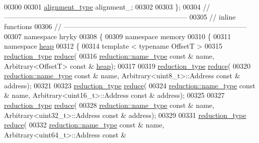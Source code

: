\begin{DoxyCode}
00300 
00301     \hyperlink{namespacehryky_aee1af251193c2d308aaa68ef7e36a540}{alignment_type}      alignment\_;
00302     
00303 \};
00304 \textcolor{comment}{//
      ------------------------------------------------------------------------------}
00305 \textcolor{comment}{// inline functions}
00306 \textcolor{comment}{//
      ------------------------------------------------------------------------------}
00307 \textcolor{keyword}{namespace }hryky
00308 \{
00309 \textcolor{keyword}{namespace }memory
00310 \{
00311 \textcolor{keyword}{namespace }\hyperlink{namespacehryky_1_1memory_1_1global_a6fc6103f67c837aa0f39b359588409cd}{heap}
00312 \{
00314     \textcolor{keyword}{template} < \textcolor{keyword}{typename} OffsetT >
00315     \hyperlink{namespacehryky_a343a9a4c36a586be5c2693156200eadc}{reduction_type} \hyperlink{namespacehryky_1_1memory_1_1heap_aa4df42a3456c681bd0b3c0e44fced36b}{reduce}(
00316         \hyperlink{namespacehryky_1_1reduction_ac686c30a4c8d196bbd0f05629a6b921f}{reduction::name_type} \textcolor{keyword}{const} & name, Arbitrary<OffsetT> \textcolor{keyword}{const} & \hyperlink{namespacehryky_1_1memory_1_1global_a6fc6103f67c837aa0f39b359588409cd}{heap});
00317 
00319     \hyperlink{namespacehryky_a343a9a4c36a586be5c2693156200eadc}{reduction_type} \hyperlink{namespacehryky_1_1memory_1_1heap_aa4df42a3456c681bd0b3c0e44fced36b}{reduce}(
00320         \hyperlink{namespacehryky_1_1reduction_ac686c30a4c8d196bbd0f05629a6b921f}{reduction::name_type} \textcolor{keyword}{const} & name, Arbitrary<uint8\_t>::Address \textcolor{keyword}{const} & 
      address);
00321 
00323     \hyperlink{namespacehryky_a343a9a4c36a586be5c2693156200eadc}{reduction_type} \hyperlink{namespacehryky_1_1memory_1_1heap_aa4df42a3456c681bd0b3c0e44fced36b}{reduce}(
00324         \hyperlink{namespacehryky_1_1reduction_ac686c30a4c8d196bbd0f05629a6b921f}{reduction::name_type} \textcolor{keyword}{const} & name, Arbitrary<uint16\_t>::Address \textcolor{keyword}{const} &
       address);
00325 
00327     \hyperlink{namespacehryky_a343a9a4c36a586be5c2693156200eadc}{reduction_type} \hyperlink{namespacehryky_1_1memory_1_1heap_aa4df42a3456c681bd0b3c0e44fced36b}{reduce}(
00328         \hyperlink{namespacehryky_1_1reduction_ac686c30a4c8d196bbd0f05629a6b921f}{reduction::name_type} \textcolor{keyword}{const} & name, Arbitrary<uint32\_t>::Address \textcolor{keyword}{const} &
       address);
00329 
00331     \hyperlink{namespacehryky_a343a9a4c36a586be5c2693156200eadc}{reduction_type} \hyperlink{namespacehryky_1_1memory_1_1heap_aa4df42a3456c681bd0b3c0e44fced36b}{reduce}(
00332         \hyperlink{namespacehryky_1_1reduction_ac686c30a4c8d196bbd0f05629a6b921f}{reduction::name_type} \textcolor{keyword}{const} & name, Arbitrary<uint64\_t>::Address \textcolor{keyword}{const} &

\end{DoxyCode}
